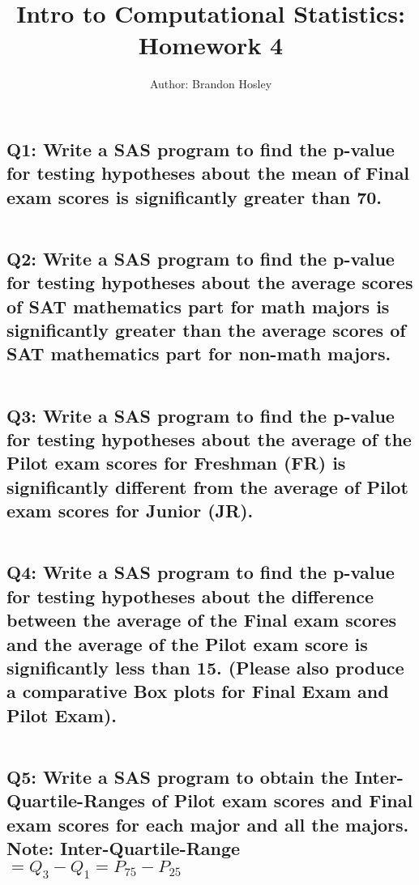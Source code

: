 \documentclass[a4paper,man,natbib]{apa6}
\title{Intro to Computational Statistics: Homework 4}
\author{Author: Brandon Hosley}
\affiliation{Instructor: Liang Kong, Ph.D}
\begin{document}
\maketitle
\singlespacing
	
\subsection*{Q1: Write a SAS program to find the p-value for testing hypotheses about the mean of Final exam scores is significantly greater than 70. }
\inputminted[breaklines,bgcolor=light-gray]{sas}{./Snippets/DAT502-HW4-1.sas}


\subsection*{Q2: Write a SAS program to find the p-value for testing hypotheses about the average scores of SAT mathematics part for math majors is significantly greater than the average scores of SAT mathematics part for non-math majors. }
\inputminted[breaklines,bgcolor=light-gray]{sas}{./Snippets/DAT502-HW4-2.sas}


\subsection*{Q3: Write a SAS program to find the p-value for testing hypotheses about the average of the Pilot exam scores for Freshman (FR) is significantly different from the average of Pilot exam scores for Junior (JR). }
\inputminted[breaklines,bgcolor=light-gray]{sas}{./Snippets/DAT502-HW4-3.sas}


\subsection*{Q4: Write a SAS program to find the p-value for testing hypotheses about the difference between the average of the Final exam scores and the average of the Pilot exam score is significantly less than 15.  (Please also produce a comparative Box plots for Final Exam and Pilot Exam). }
\inputminted[breaklines,bgcolor=light-gray]{sas}{./Snippets/DAT502-HW4-4.sas}


\subsection*{Q5: Write a SAS program to obtain the Inter-Quartile-Ranges of Pilot exam scores and Final exam scores for each major and all the majors. \\ Note: Inter-Quartile-Range $=Q_3-Q_1=P_{75}-P_{25}$ }
\inputminted[breaklines,bgcolor=light-gray]{sas}{./Snippets/DAT502-HW4-5.sas}

\end{document}
